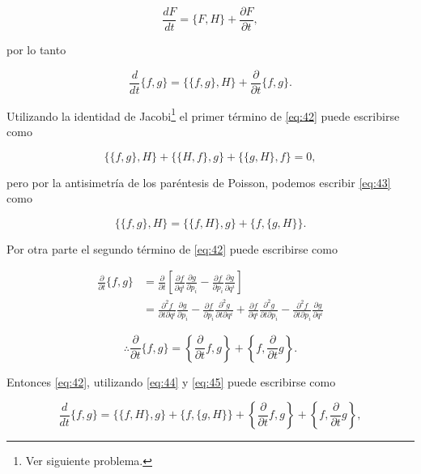 \documentclass[a4paper,10pt]{article}
\numberwithin{equation}{section}
\begin{document}
\begin{equation}
 \frac{dF}{dt} = \{F,H\} + \frac{\partial F}{\partial t},
 \label{eq:41}
\end{equation}

por lo tanto

\begin{equation}
 \frac{d}{dt}\{f,g\} = \{\{f,g\},H\} + \frac{\partial}{\partial t}\{f,g\}.
 \label{eq:42}
\end{equation}

Utilizando la identidad de Jacobi\footnote{Ver siguiente problema.} el primer término 
de \eqref{eq:42} puede escribirse como

\begin{equation}
 \{\{f,g\},H\} +  \{\{H,f\},g\} +  \{\{g,H\},f\} = 0,
 \label{eq:43}
\end{equation}

pero por la antisimetría de los paréntesis de Poisson, podemos escribir \eqref{eq:43} 
como

\begin{equation}
  \{\{f,g\},H\} = \{\{f,H\},g\} + \{f,\{g,H\}\}.
 \label{eq:44}
\end{equation}

Por otra parte el segundo término de \eqref{eq:42} puede escribirse como 

\begin{align*}
 \frac{\partial}{\partial t}\{f,g\} &= \frac{\partial}{\partial t}
 \left[\frac{\partial f}{\partial q^i}\frac{\partial g}{\partial p_i} - 
 \frac{\partial f}{\partial p_i}\frac{\partial g}{\partial q^i}\right] \\
 &= \frac{\partial^2 f}{\partial t\partial q^i}\frac{\partial g}{\partial p_i} 
 - \frac{\partial f}{\partial p_i}\frac{\partial^2 g}{\partial t \partial q^i}
 + \frac{\partial f}{\partial q^i}\frac{\partial^2 g}{\partial t \partial p_i}
 - \frac{\partial^2 f}{\partial t\partial p_i}\frac{\partial g}{\partial q^i} 
\end{align*}

\begin{equation}
 \therefore \frac{\partial}{\partial t}\{f,g\} = \left\{\frac{\partial}{\partial t}f,g\right\}
 + \left\{f, \frac{\partial}{\partial t}g\right\}.
 \label{eq:45}
\end{equation}

Entonces \eqref{eq:42}, utilizando \eqref{eq:44} y \eqref{eq:45} puede escribirse como

\begin{equation}
 \frac{d}{dt}\{f,g\} =  \{\{f,H\},g\} + \{f,\{g,H\}\} + \left\{\frac{\partial}{\partial t}f,g\right\}
 + \left\{f, \frac{\partial}{\partial t}g\right\},
 \label{eq:46}
\end{equation}
\end{document}
